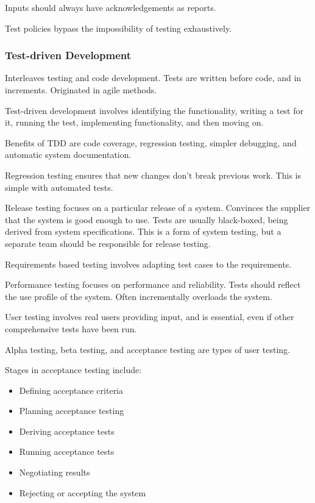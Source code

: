 \documentclass[12pt]{article}
\begin{document}
Inputs should always have acknowledgements as reports.

Test policies bypass the impossibility of testing exhaustively.

\subsubsection*{Test-driven Development}

Interleaves testing and code development. Tests are written before code, and in
increments. Originated in agile methods.

Test-driven development involves identifying the functionality, writing a test
for it, running the test, implementing functionality, and then moving on.

Benefits of TDD are code coverage, regression testing, simpler debugging, and
automatic system documentation.

Regression testing ensures that new changes don't break previous work. This is
simple with automated tests.

Release testing focuses on a particular release of a system. Convinces the
supplier that the system is good enough to use. Tests are usually black-boxed,
being derived from system specifications. This is a form of system testing, but
a separate team should be responsible for release testing.

Requirements based testing involves adapting test cases to the requirements.

Performance testing focuses on performance and reliability. Tests should reflect
the use profile of the system. Often incrementally overloads the system.

User testing involves real users providing input, and is essential, even if
other comprehensive tests have been run.

Alpha testing, beta testing, and acceptance testing are types of user testing.

Stages in acceptance testing include:

\begin{itemize}
    \item Defining acceptance criteria
    \item Planning acceptance testing
    \item Deriving acceptance tests
    \item Running acceptance tests
    \item Negotiating results
    \item Rejecting or accepting the system
\end{itemize}
\end{document}
